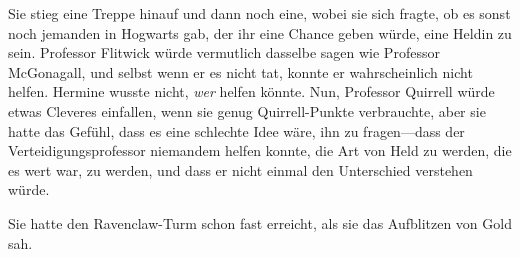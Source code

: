 Sie stieg eine Treppe hinauf und dann noch eine, wobei sie sich fragte, ob es sonst noch jemanden in Hogwarts gab, der ihr eine Chance geben würde, eine Heldin zu sein. Professor Flitwick würde vermutlich dasselbe sagen wie Professor McGonagall, und selbst wenn er es nicht tat, konnte er wahrscheinlich nicht helfen. Hermine wusste nicht, \emph{wer} helfen könnte. Nun, Professor Quirrell würde etwas Cleveres einfallen, wenn sie genug Quirrell-Punkte verbrauchte, aber sie hatte das Gefühl, dass es eine schlechte Idee wäre, ihn zu fragen—dass der Verteidigungsprofessor niemandem helfen konnte, die Art von Held zu werden, die es wert war, zu werden, und dass er nicht einmal den Unterschied verstehen würde.

Sie hatte den Ravenclaw-Turm schon fast erreicht, als sie das Aufblitzen von Gold sah.

